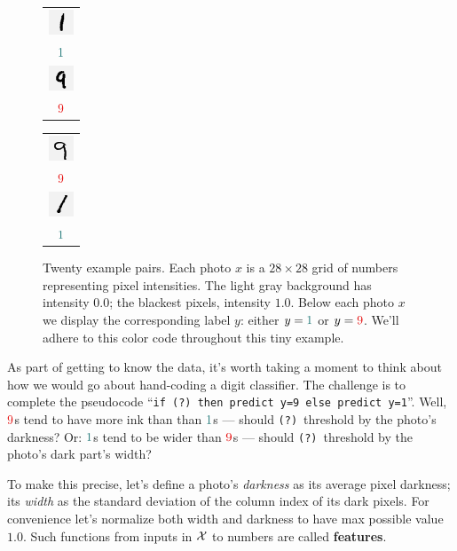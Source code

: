 \documentclass[11pt, justified]{tufte-book}
\newcounter{footprintssofar}
\newcommand{\plainfootprint}{{\bro \rotatebox{\value{footprintssofar}}{\faIcon{shoe-prints}}}\setcounter{footprintssofar}{\value{footprintssofar}+30} }
\newcommand{\footprint}{\marginnote{\plainfootprint} }
\theoremstyle{definition}
\begin{document}
\begin{figure}
          \begin{tabular}{c}\includegraphics[width=0.75cm]{example-mnist/mnist-trn-08}\\$\cya{1}$\\\includegraphics[width=0.75cm]{example-mnist/mnist-trn-18}\\$\red{9}$\end{tabular}%
          \begin{tabular}{c}\includegraphics[width=0.75cm]{example-mnist/mnist-trn-09}\\$\red{9}$\\\includegraphics[width=0.75cm]{example-mnist/mnist-trn-19}\\$\cya{1}$\end{tabular}%
          \caption{
            Twenty example pairs.  Each photo $x$ is a $28\times 28$ grid of
            numbers representing pixel intensities.  The light gray background
            has intensity $0.0$; the blackest pixels, intensity $1.0$.  Below
            each photo $x$ we display the corresponding label $y$:
            either $y= {\cya{1}}$ or
            $y={\red{9}}$.
            We'll adhere to this color code throughout this tiny example.
          }
        \end{figure}

        \footprint
        As part of getting to know the data, it's worth taking a moment to
        think about how we would go about hand-coding a digit classifier.  The
        challenge is to complete the pseudocode
        ``\texttt{if (?)\ then predict y=9 else predict y=1}''.
        Well, ${\red{9}}$s tend to have more ink than than ${\cya{1}}$s ---
        should \texttt{(?)}\ threshold by the photo's darkness?
        Or: ${\cya{1}}$s tend to be wider than ${\red{9}}$s --- should 
        \texttt{(?)}\ threshold by the photo's dark part's width?

        To make this precise, let's define a photo's \emph{darkness} as its
        average pixel darkness; its \emph{width} as the standard deviation of
        the column index of its dark pixels.  For convenience let's normalize
        both width and darkness to have max possible value $1.0$.  Such
        functions from inputs in $\mathcal{X}$ to numbers are called
        \textbf{features}.\footprint
\end{document}
